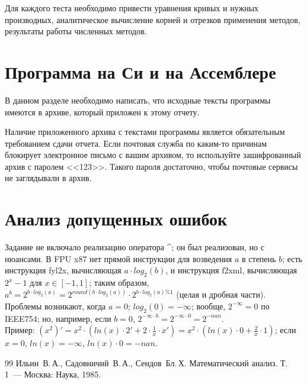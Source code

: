 \documentclass[a4paper,12pt,titlepage,finall]{article}
\begin{document}
Для каждого теста необходимо привести уравнения кривых и нужных производных,
аналитическое вычисление корней и отрезков применения методов, результаты
работы численных методов.

\newpage

\section{Программа на Си и на Ассемблере}

В данном разделе необходимо написать, что
исходные тексты программы имеются в архиве, который приложен к этому отчету.

Наличие приложенного архива с текстами программы является обязательным
требованием сдачи отчета. Если почтовая служба по каким-то причинам блокирует
электронное письмо с вашим архивом, то используйте зашифрованный архив с паролем <<123>>.
Такого пароля достаточно, чтобы почтовые сервисы не заглядывали в архив.

\newpage

\section{Анализ допущенных ошибок}

Задание не включало реализацию оператора \^{}; он был реализован, но с нюансами. В FPU x87 нет прямой инструкции для возведения $a$ в степень $b$; есть инструкция fyl2x, вычисляющая $a \cdot log_2(b)$, и инструкция f2xml, вычисляющая $2^x-1$ для $x \in [-1, 1]$; таким образом, $a^b = 2^{b \cdot log_2(a)} = 2^{round(b \cdot log_2(a))} \cdot 2^{b \cdot log_2(a) \% 1}$ (целая и дробная части).\\

Проблемы возникают, когда $a=0$; $log_2(0) = -\infty$; вообще, $2^{-\infty} = 0$ по IEEE754; но, например, если $b=0$, $2^{-\infty \cdot b} = 2^{-\infty \cdot 0} = 2^{-nan}$.\\

Пример:
$(x^2)' = x^2 \cdot (ln(x) \cdot 2' + 2 \cdot \frac{1}{x} \cdot x') = x^2 \cdot (ln(x) \cdot 0 + \frac{2}{x} \cdot 1)$; если $x=0$, $ln(x)=-\infty$, $ln(x)\cdot 0 = -nan$.

\newpage
\begin{raggedright}
\begin{thebibliography}{99}
 Ильин~В.\,А., Садовничий~В.\,А., Сендов~Бл.\,Х. Математический анализ. Т.\,1~---
    Москва: Наука, 1985.
\end{thebibliography}
\end{raggedright}
\end{document}
